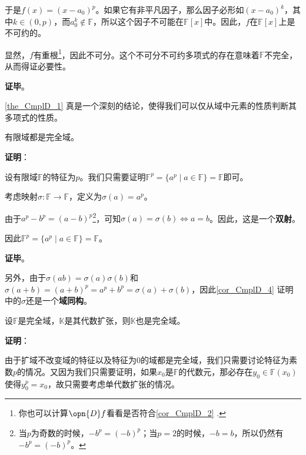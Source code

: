 于是$f(x)=(x-a_0)^p$。如果它有非平凡因子，那么因子必形如$(x-a_0)^k$，其中$k\in(0, p)$，而$a_0^k\not\in\mathbb{F}$，所以这个因子不可能在$\mathbb{F}[x]$中。因此，$f$在$\mathbb{F}[x]$上是不可约的。

显然，$f$有重根\footnote{你也可以计算$\opn{D}f$看看是否符合\autoref{cor_CmplD_2} .}，因此不可分。这个不可分不可约多项式的存在意味着$\mathbb{F}$不完全，从而得证必要性。

\textbf{证毕}。

\autoref{the_CmplD_1} 真是一个深刻的结论，使得我们可以仅从域中元素的性质判断其多项式的性质。

\begin{corollary}{}\label{cor_CmplD_4}
有限域都是完全域。
\end{corollary}

\textbf{证明}：

设有限域$\mathbb{F}$的特征为$p$。我们只需要证明$\mathbb{F}^p=\{a^p\mid a\in\mathbb{F}\}=\mathbb{F}$即可。

考虑映射$\sigma:\mathbb{F}\to\mathbb{F}$，定义为$\sigma(a)=a^p$。

由于$a^p-b^p=(a-b)^p$\footnote{当$p$为奇数的时候，$-b^p=(-b)^p$；当$p=2$的时候，$-b=b$，所以仍然有$-b^p=(-b)^p$。}，可知$\sigma(a)=\sigma(b)\iff a=b$。因此，这是一个\textbf{双射}。

因此$\mathbb{F}^p=\{a^p\mid a\in\mathbb{F}\}=\mathbb{F}$。

\textbf{证毕}。

另外，由于$\sigma(ab)=\sigma(a)\sigma(b)$和$\sigma(a+b)=(a+b)^p=a^p+b^p=\sigma(a)+\sigma(b)$，因此\autoref{cor_CmplD_4} 证明中的$\sigma$还是一个\textbf{域同构}。


\begin{corollary}{}\label{cor_CmplD_5}
设$\mathbb{F}$是完全域，$\mathbb{K}$是其代数扩张，则$\mathbb{K}$也是完全域。
\end{corollary}

\textbf{证明}：

由于扩域不改变域的特征以及特征为$0$的域都是完全域，我们只需要讨论特征为素数$p$的情况。又因为我们只需要证明，如果$x_0$是$\mathbb{F}$的代数元，那必存在$y_0\in\mathbb{F}(x_0)$使得$y_0^p=x_0$，故只需要考虑单代数扩张的情况。



